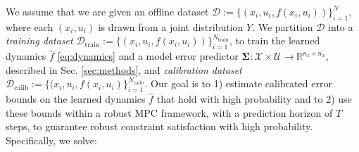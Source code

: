 \documentclass{l4dc2026}
\begin{document}
We assume that we are given an offline dataset $\mathcal{D} := \{(x_i, u_i, f(x_i, u_i))\}_{i=1}^{N}$, where each $(x_i, u_i)$ is drawn from a joint distribution $Y$. We partition $\mathcal{D}$ into a \textit{training dataset} $\mathcal{D}_\textrm{train} := \{(x_i, u_i, f(x_i, u_i))\}_{i=1}^{N_\textrm{train}}$, to train the learned dynamics $\hat f$ \eqref{eq:dynamics} and a model error predictor $\mathbf{\Sigma}: \mathcal{X} \times \mathcal{U} \rightarrow \mathbb{R}^{n_x \times n_x}$, described in Sec. \ref{sec:methods}, and \textit{calibration dataset} $\mathcal{D}_\textrm{calib} := \{(x_i, u_i, f(x_i, u_i)\}_{i=1}^{N_\textrm{calib}}$. Our goal is to 1) estimate calibrated error bounds on the learned dynamics $\hat f$ that hold with high probability and to 2) use these bounds within a robust MPC framework, with a prediction horizon of $T$ steps, to guarantee robust constraint satisfaction with high probability. Specifically, we solve: 


\end{document}
